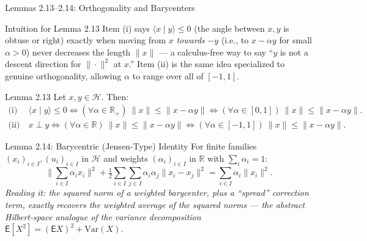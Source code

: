 \documentclass[aspectratio=169,10pt]{beamer}
\newcommand{\R}{\mathbb{R}}
\newcommand{\Hil}{\mathcal{H}}
\newcommand{\ip}[2]{\langle #1 \mid #2 \rangle}
\begin{document}
\begin{frame}{Lemmas 2.13--2.14: Orthogonality and Barycenters}
  \begin{block}{Intuition for Lemma 2.13}
    Item (i) says $\ip{x}{y}\le 0$ (the angle between $x,y$ is obtuse or
    right) exactly when moving from $x$ \emph{towards} $-y$ (i.e., to
    $x-\alpha y$ for small $\alpha>0$) never decreases the length $\|x\|$ ---
    a calculus-free way to say ``$y$ is not a descent direction for
    $\|\cdot\|^2$ at $x$.'' Item (ii) is the same idea specialized to
    genuine orthogonality, allowing $\alpha$ to range over all of $[-1,1]$.
  \end{block}

  \begin{block}{Lemma 2.13}
    Let $x,y \in \Hil$. Then:
    \begin{align*}
      \text{(i)}\ & \ip{x}{y}\le 0 \iff (\forall \alpha\in\R_+)\ \|x\|\le
        \|x-\alpha y\| \iff (\forall \alpha\in[0,1])\ \|x\|\le\|x-\alpha y\|.\\
      \text{(ii)}\ & x\perp y \iff (\forall \alpha\in\R)\ \|x\|\le\|x-\alpha
        y\| \iff (\forall \alpha\in[-1,1])\ \|x\|\le\|x-\alpha y\|.
    \end{align*}
  \end{block}

  \begin{block}{Lemma 2.14: Barycentric (Jensen-Type) Identity}
    For finite families $(x_i)_{i\in I},(u_i)_{i\in I}$ in $\Hil$ and
    weights $(\alpha_i)_{i\in I}$ in $\R$ with $\sum_i \alpha_i = 1$:
    \[
      \Big\|\sum_{i\in I}\alpha_i x_i\Big\|^2 + \tfrac12\sum_{i\in
      I}\sum_{j\in I}\alpha_i\alpha_j\|x_i-x_j\|^2 = \sum_{i\in
      I}\alpha_i\|x_i\|^2.
    \]
    \textit{Reading it: the squared norm of a weighted barycenter, plus a
    ``spread'' correction term, exactly recovers the weighted average of
    the squared norms --- the abstract Hilbert-space analogue of the
    variance decomposition $\mathsf E[X^2]=(\mathsf E X)^2+\mathrm{Var}(X)$.}
  \end{block}
\end{frame}
\end{document}
